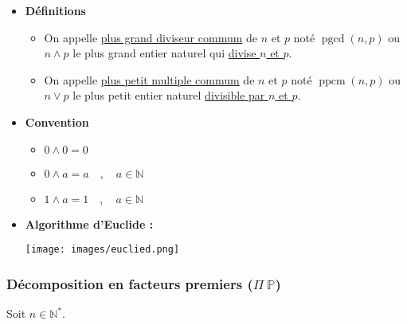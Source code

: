 \documentclass{report}
\newcommand{\N}{\mathbb{N}}
\newcommand{\ppcm}{\operatorname{ppcm}}
\newcommand{\pgcd}{\operatorname{pgcd}}
\begin{document}
      \begin{itemize}
				\item \textbf{Définitions} 
          \begin{itemize}
            \item On appelle \underline{plus grand diviseur commum} de $n$ et $p$ noté $\pgcd(n,p)$ ou $n \land p$ le plus grand entier naturel qui \underline{divise $n$ et $p$}.
            \item On appelle \underline{plus petit multiple commum} de $n$ et $p$ noté $\ppcm(n,p)$ ou $n \lor p$ le plus petit entier naturel \underline{divisible par $n$ et $p$}.
          \end{itemize}
        \item \textbf{Convention} 
          \begin{itemize}
            \item $0\land 0 = 0$
            \item $0\land a = a \quad , \quad a\in\N$
            \item $1\land a = 1 \quad , \quad a\in\N$
          \end{itemize}
        \item \textbf{Algorithme d'Euclide : } 
          \begin{center}
            \texttt{[image: images/euclied.png]}
          \end{center}
        
			\end{itemize}

      \subsubsection{Décomposition en facteurs premiers ($\Pi~\mathbb{P}$)}

        Soit $n\in\N^*$.
\end{document}
